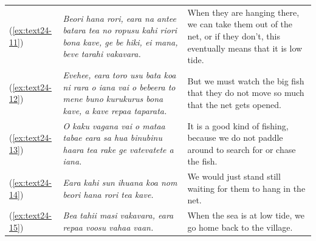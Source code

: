 \documentclass[output=paper]{langscibook}
\begin{document}
\begin{xltabular}{\textwidth}{lXX}
	(\ref{ex:text24-11})&\textit{Beori hana rori, eara na antee batara tea no ropusu kahi riori bona kave, ge be hiki, ei mana, beve tarahi vakavara.}&When they are hanging there, we can take them out of the net, or if they don’t, this eventually means that it is low tide.\\
	(\ref{ex:text24-12})&\textit{Evehee, eara toro usu bata koa ni rara o iana vai o bebeera to mene buno kurukurus bona kave, a kave repaa taparata.}&But we must watch the big fish that they do not move so much that the net gets opened.\\
	(\ref{ex:text24-13})&\textit{O kaku vagana vai o mataa tabae eara sa hua binubinu haara tea rake ge vatevatete a iana.}&It is a good kind of fishing, because we do not paddle around to search for or chase the fish.\\
	(\ref{ex:text24-14})&\textit{Eara kahi sun ihuana koa nom beori hana rori tea kave.}&We would just stand still waiting for them to hang in the net.\\
	(\ref{ex:text24-15})&\textit{Bea tahii masi vakavara, eara repaa voosu vahaa vaan.}&When the sea is at low tide, we go home back to the village.\\
\end{xltabular}
\end{document}
